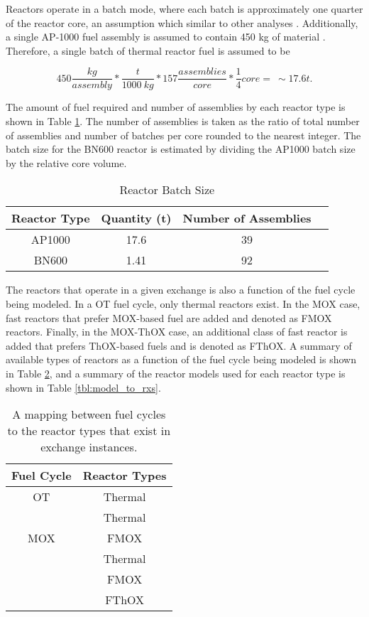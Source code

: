 Reactors operate in a batch mode, where each batch is approximately one quarter
of the reactor core, an assumption which similar to other analyses
\cite{rineiski2011reactivity}. Additionally, a single AP-1000 fuel assembly is
assumed to contain 450 kg of material \cite{kok2009nuclear}. Therefore, a single
batch of thermal reactor fuel is assumed to be

\begin{equation}
   450 \frac{kg}{assembly} * \frac{t}{1000 \: kg} * 157 \frac{assemblies}{core}
   * \frac{1}{4} core = \: \sim 17.6 t.
\end{equation}

\noindent
The amount of fuel required and number of assemblies by each reactor type is
shown in Table \ref{tbl:rx_batch}. The number of assemblies is taken as the
ratio of total number of assemblies and number of batches per core rounded to
the nearest integer. The batch size for the BN600 reactor is estimated by
dividing the AP1000 batch size by the relative core volume.

\begin{table}[h!]
\centering
\caption{Reactor Batch Size}
\label{tbl:rx_batch}
\begin{tabular}{|c|c|c|c|}
\hline
\textbf{Reactor Type} & \textbf{Quantity (t)} & \textbf{Number of Assemblies}
\\ \hline AP1000 & 17.6 & 39 \\ \hline BN600 & 1.41 & 92 \\ \hline
\end{tabular}
\end{table}

The reactors that operate in a given exchange is also a function of the fuel
cycle being modeled. In a OT fuel cycle, only thermal reactors exist. In the MOX
case, fast reactors that prefer MOX-based fuel are added and denoted as FMOX
reactors. Finally, in the MOX-ThOX case, an additional class of fast reactor is
added that prefers ThOX-based fuels and is denoted as FThOX. A summary of
available types of reactors as a function of the fuel cycle being modeled is
shown in Table \ref{tbl:fc_to_rxs}, and a summary of the reactor models used for
each reactor type is shown in Table \ref{tbl:model_to_rxs}. 

\begin{table}[h!]
\centering
\caption{A mapping between fuel cycles to the reactor types that exist in exchange instances.}
\label{tbl:fc_to_rxs}
\begin{tabular}{|c|c|}
\hline
\textbf{Fuel Cycle}            & \textbf{Reactor Types} \\ \hline
OT                    & Thermal         \\ \hline
\multirow{3}{*}{MOX}  & Thermal         \\  
                      & FMOX        \\ \hline
\multirow{4}{*}{ThOX} & Thermal         \\  
                      & FMOX        \\  
                      & FThOX       \\ \hline
\end{tabular}
\end{table}

